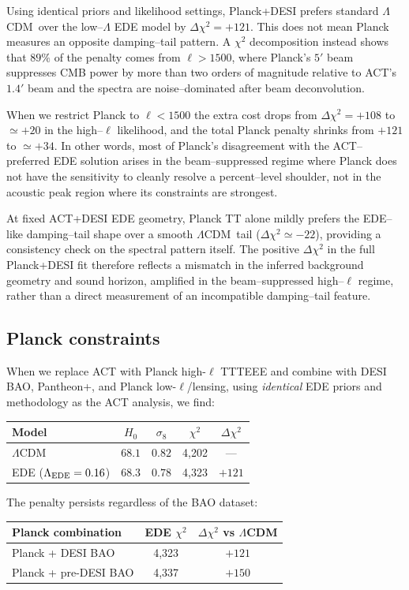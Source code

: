 \documentclass[twocolumn,showpacs,preprintnumbers,amsmath,amssymb,prd]{revtex4-2}
\newcommand{\lcdm}{$\Lambda$CDM}
\begin{document}
Using identical priors and likelihood settings, Planck+DESI prefers standard
\lcdm\ over the low--$\Lambda$ EDE model by $\Delta\chi^2 = +121$. This does
not mean Planck measures an opposite damping--tail pattern. A $\chi^2$
decomposition instead shows that $89\%$ of the penalty comes from
$\ell > 1500$, where Planck's $5'$ beam suppresses CMB power by more than two
orders of magnitude relative to ACT's $1.4'$ beam and the spectra are
noise--dominated after beam deconvolution.

When we restrict Planck to $\ell < 1500$ the extra cost drops from
$\Delta\chi^2 = +108$ to $\simeq +20$ in the high--$\ell$ likelihood, and the
total Planck penalty shrinks from $+121$ to $\simeq +34$. In other words, most
of Planck's disagreement with the ACT--preferred EDE solution arises in the
beam--suppressed regime where Planck does not have the sensitivity to cleanly
resolve a percent--level shoulder, not in the acoustic peak region where its
constraints are strongest.

At fixed ACT+DESI EDE geometry, Planck TT alone mildly prefers the EDE--like
damping--tail shape over a smooth \lcdm\ tail ($\Delta\chi^2 \simeq -22$),
providing a consistency check on the spectral pattern itself. The positive
$\Delta\chi^2$ in the full Planck+DESI fit therefore reflects a mismatch in
the inferred background geometry and sound horizon, amplified in the
beam--suppressed high--$\ell$ regime, rather than a direct measurement of an
incompatible damping--tail feature.

\subsection{Planck constraints}

When we replace ACT with Planck high-$\ell$ TTTEEE and combine with DESI BAO, 
Pantheon+, and Planck low-$\ell$/lensing, using \emph{identical} EDE priors 
and methodology as the ACT analysis, we find:
\begin{center}
\begin{tabular}{lcccc}
\toprule
Model & $H_0$ & $\sigma_8$ & $\chi^2$ & $\Delta\chi^2$ \\
\midrule
\lcdm & $68.1$ & $0.82$ & 4,202 & --- \\
EDE ($\Lambda_{\rm EDE} = 0.16$) & $68.3$ & $0.78$ & 4,323 & $+121$ \\
\bottomrule
\end{tabular}
\end{center}

The penalty persists regardless of the BAO dataset:
\begin{center}
\begin{tabular}{lcc}
\toprule
Planck combination & EDE $\chi^2$ & $\Delta\chi^2$ vs \lcdm \\
\midrule
Planck + DESI BAO & 4,323 & $+121$ \\
Planck + pre-DESI BAO & 4,337 & $+150$ \\
\bottomrule
\end{tabular}
\end{center}
\end{document}
